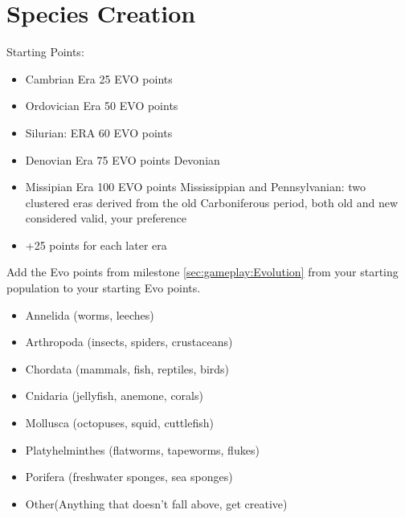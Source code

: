 \chapter{Species Creation}
\label{sec:background:first_section}

Starting Points:
\begin{itemize}
	\item Cambrian Era  25 EVO points
	\item Ordovician Era 50 EVO points
	\item Silurian: ERA 60 EVO points
	\item Denovian Era 75 EVO points Devonian
	\item Missipian Era 100 EVO points Mississippian and Pennsylvanian: two clustered eras derived from the old Carboniferous period, both old and new considered valid, your preference
	\item +25 points for each later era
\end{itemize}

Add the Evo points from milestone \ref{sec:gameplay:Evolution} from your starting population to your starting Evo points.
\newline
\begin{itemize}
	\item Annelida (worms, leeches)
	\item Arthropoda (insects, spiders, crustaceans)
	\item Chordata (mammals, fish, reptiles, birds)
	\item Cnidaria (jellyfish, anemone, corals)
	\item Mollusca (octopuses, squid, cuttlefish)
	\item Platyhelminthes (flatworms, tapeworms, flukes)
	\item Porifera (freshwater sponges, sea sponges)
	\item Other(Anything that doesn't fall above, get creative)
\end{itemize}
